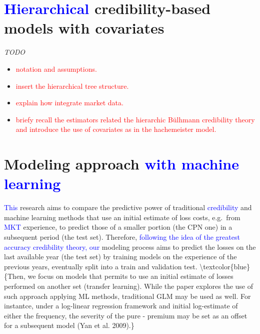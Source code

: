 \documentclass[
]{article}
\providecommand{\tightlist}{%
  \setlength{\itemsep}{0pt}\setlength{\parskip}{0pt}}
\begin{document}
\hypertarget{credibility-based-models-with-covariates}{%
\section{\texorpdfstring{\textcolor{blue}{Hierarchical}
credibility-based models with
covariates}{ credibility-based models with covariates}}\label{credibility-based-models-with-covariates}}

\emph{TODO}

\begin{itemize}
\tightlist
\item
  \textcolor{red}{notation and assumptions.}
\item
  \textcolor{red}{insert the hierarchical tree structure.}
\item
  \textcolor{red}{explain how integrate market data.}
\item
  \textcolor{red}{briefy recall the estimators related the hierarchic Bülhmann credibility theory and introduce the use of covariates as in the hachemeister model.}
\end{itemize}

\hypertarget{modeling-approach}{%
\section{\texorpdfstring{Modeling approach
\textcolor{blue}{with machine learning}}{Modeling approach }}\label{modeling-approach}}

\textcolor{blue}{This} research aims to compare the predictive power of
traditional \textcolor{blue}{credibility} and machine learning methods
that use an initial estimate of loss costs, e.g.~from
\textcolor{blue}{MKT} experience, to predict those of a smaller portion
(the CPN one) in a subsequent period (the test set). Therefore,
\textcolor{blue}{following the idea of the greatest accuracy credibility theory, our}
modeling process aims to predict the losses on the last available year
(the test set) by training models on the experience of the previous
years, eventually split into a train and validation test.
\textbackslash textcolor\{blue\}\{Then, we focus on models that permits
to use an initial estimate of losses performed on another set (transfer
learning). While the paper explores the use of such approach applying ML
methods, traditional GLM may be used as well. For instantce, under a
log-linear regression framework and initial log-estimate of either the
frequency, the severity of the pure - premium may be set as an offset
for a subsequent model (Yan et al. 2009).\}
\end{document}
